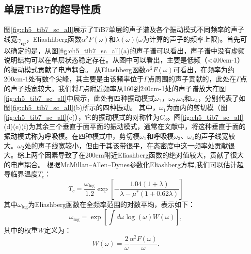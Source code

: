 \subsection{单层TiB7的超导性质}
图\ref{fig:ch5_tib7_sc_all}展示了TiB7单层的声子谱及各个振动模式不同频率的声子线宽$\gamma_{\bm{q}j}$，Eliashhberg函数$\alpha^2 F(\omega)$和$\lambda(\omega)$($\omega$为计算的声子的频率上限)。首先可以确定的是，从图\ref{fig:ch5_tib7_sc_all}(a)的声子谱可以看出，声子谱中没有虚频说明结构可以在单层状态稳定存在。从图中可以看出，主要是低频（<400cm-1）的振动模式贡献了电声耦合。
从Eliashberg函数$\alpha^2 F(\omega)$可看出，在频率为约200cm-1处有数个尖峰，其主要是由该频率位于$\Gamma$点周围的声子贡献的，此处在$\Gamma$点的声子线宽较大。我们将$\Gamma$点附近频率从160到240cm-1处的声子谱放大在图\ref{fig:ch5_tib7_sc_all}中展示，此处有四种振动模式$\omega_1$，$\omega_2$,$\omega_3$和$\omega_4$，分别代表了如图\ref{fig:ch5_tib7_sc_all}(b)所示的四种振动。
其中，$\omega_1$为面内的剪切模（图\ref{fig:ch5_tib7_sc_all}(c)），它的振动模式的对称性为$C_3$。图\ref{fig:ch5_tib7_sc_all}(d)(e)(f)为其余三个垂直于面平面的振动模式，通常在文献中，将这种垂直于面的振动模式称为呼吸模。在四种模式中，剪切模$\omega_1$和呼吸模$\omega_3$、$\omega_4$的声子线宽较大。$\omega_2$处的声子线宽较小，但由于其该带很平，在态密度中这一频率处贡献很大。综上两个因素导致了在200cm附近Eliashberg函数的绝对值较大，贡献了很大的电声耦合。
根据McMillan–Allen–Dynes参数化Eliashberg方程,我们可以估计超导临界温度$T_c$：
\begin{equation}
  T_c = \frac{\omega_{\mathrm{log}}}{1.2}
  \exp{\left[ {-\frac{1.04(1+\lambda)}{\lambda-\mu^*(1+0.62\lambda)}} \right]}
\end{equation}
其中$\omega_{\mathrm{log}}$为Eliashberg函数在全频率范围的对数平均，表示如下：
\begin{equation}
  \omega_\mathrm{log} = \exp \left[ {\int d\omega \log(\omega)W(\omega)} \right],
\end{equation}
其中的权重$W$定义为：
\begin{equation}
  W(\omega) = \frac{2}{\omega} \frac{\alpha^2 F(\omega)}{\omega}.
\end{equation}

